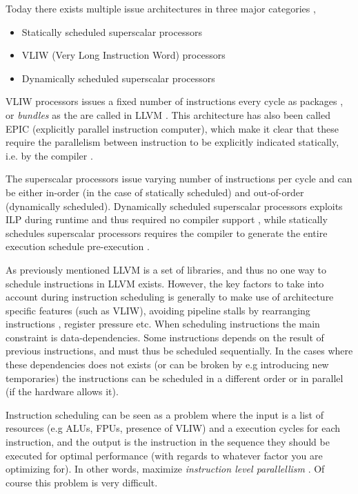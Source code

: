 Today there exists multiple issue architectures in three major categories \cite[Section~3.7]{caqa},

\begin{itemize}
	\item Statically scheduled superscalar processors
	\item VLIW (Very Long Instruction Word) processors
	\item Dynamically scheduled superscalar processors
\end{itemize}

VLIW processors issues a fixed number of instructions every cycle as packages \cite[Section~3.7]{caqa},
or \textit{bundles} as the are called in LLVM \cite{llvm-codegenerator-bundles}. This
architecture has also been called EPIC (explicitly parallel instruction computer), which
make it clear that these require the parallelism between instruction to be explicitly
indicated statically, i.e. by the compiler \cite[Section~3.7]{caqa}.

The superscalar processors issue varying number of instructions per cycle and can be either
in-order (in the case of statically scheduled) and out-of-order (dynamically scheduled).
Dynamically scheduled superscalar processors exploits ILP during runtime and thus required
no compiler support \cite[Section~3.4]{caqa}, while statically schedules superscalar
processors requires the compiler to generate the entire execution schedule pre-execution
\cite[Section~3.7]{caqa}.

As previously mentioned LLVM is a set of libraries, and thus no one way to schedule instructions
in LLVM exists. However, the key factors to take into account during instruction scheduling
is generally to make use of architecture specific features (such as VLIW), avoiding pipeline
stalls by rearranging instructions \cite[Section~3.2]{caqa}, register pressure
\cite{llvm-inst-sched-superscalar-vliw} etc. When scheduling instructions the main
constraint is data-dependencies. Some instructions depends on the result of previous
instructions, and must thus be scheduled sequentially. In the cases where these
dependencies does not exists (or can be broken by e.g introducing new temporaries) the
instructions can be scheduled in a different order or in parallel (if the hardware allows it).

Instruction scheduling can be seen as a problem where the input is a list of resources
(e.g ALUs, FPUs, presence of VLIW) and a execution cycles for each instruction, and the
output is the instruction in the sequence they should be executed for optimal performance
(with regards to whatever factor you are optimizing for). In other words, maximize
\textit{instruction level parallellism} \cite{inst-sched-cmu}. Of course this problem is
very difficult.

